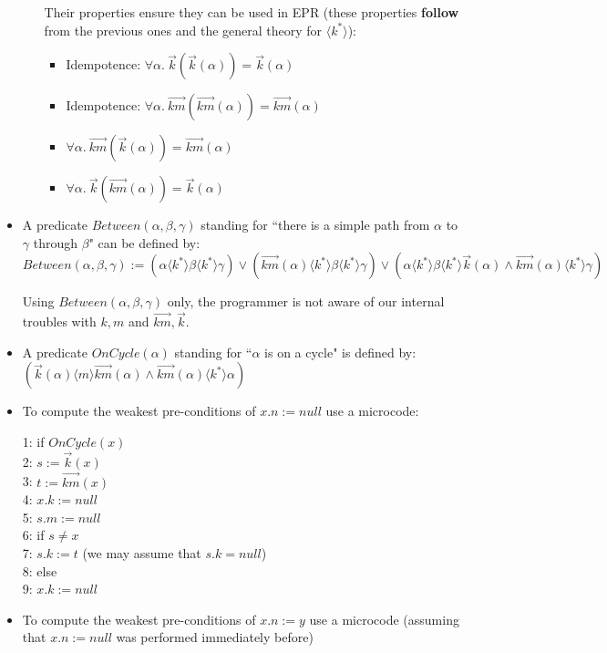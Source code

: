 \documentclass[11pt,a4paper,oneside,draft]{article}
\theoremstyle{definition}
\theoremstyle{remark}
\newcommand{\tup}[1]{{\langle #1 \rangle}}
\begin{document}
\begin{itemize}
\begin{itemize}
\begin{itemize}
\end{itemize}

Their properties ensure they can be used in EPR (these properties {\bf follow} from the previous ones and the general theory for $\tup{k^*}$):
\begin{itemize}
\item Idempotence: $\forall \alpha.~\vec{k}(\vec{k}(\alpha))=\vec{k}(\alpha)$ 
\item Idempotence: $\forall \alpha.~\vec{km}(\vec{km}(\alpha))=\vec{km}(\alpha)$
\item $\forall \alpha.~\vec{km}(\vec{k}(\alpha))=\vec{km}(\alpha)$ 
\item $\forall \alpha.~\vec{k}(\vec{km}(\alpha))=\vec{k}(\alpha)$ 
\end{itemize}
\end{itemize}


\item A predicate $Between(\alpha,\beta,\gamma)$ standing for ``there is a simple path
from $\alpha$ to $\gamma$ through $\beta$" can be defined by:
$$Between(\alpha,\beta,\gamma):= (\alpha \tup{k^*} \beta \tup{k^*} \gamma)
\lor (\vec{km}(\alpha) \tup{k^*} \beta \tup{k^*} \gamma)
\lor (\alpha \tup{k^*} \beta \tup{k^*} \vec{k}(\alpha) \land \vec{km}(\alpha) \tup{k^*} \gamma)$$

Using $Between(\alpha,\beta,\gamma)$ only, the programmer is not aware of our internal troubles with $k,m$ and $\vec{km},\vec{k}$.

\item A predicate $OnCycle(\alpha)$ standing for ``$\alpha$ is on a cycle" is defined by:
$(\vec{k}(\alpha) \tup{m} \vec{km}(\alpha) \land \vec{km}(\alpha) \tup{k^*} \alpha)$

\item To compute the weakest pre-conditions of $x.n := null$ use a microcode:

1: if  $OnCycle(x)$ \\
2: \qquad $s := \vec{k}(x)$ \\
3: \qquad $t := \vec{km}(x)$ \\
4: \qquad $x.k := null$ \\
5: \qquad $s.m := null$ \\
6: \qquad if $s \neq x$ \\
7: \qquad \qquad  $s.k := t$ (we may assume that $s.k = null$)\\
8: else \\
9: \qquad $x.k := null$


\item To compute the weakest pre-conditions of $x.n := y$ use a microcode (assuming that $x.n := null$ was performed immediately before)


\end{itemize}
\end{document}
